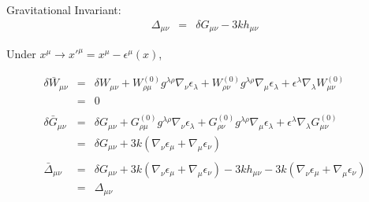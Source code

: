 \documentclass[10pt,letterpaper]{article}
\numberwithin{equation}{section}
\begin{document}
Gravitational Invariant:
\begin{eqnarray}
\Delta_{\mu\nu} &=& \delta G_{\mu\nu} - 3kh_{\mu\nu}
\end{eqnarray}

Under $x^\mu \to x'^{\mu} = x^\mu -\epsilon^\mu(x)$,

\begin{eqnarray}
\delta \bar W_{\mu\nu} &=& \delta W_{\mu\nu} + W^{(0)}_{\rho\mu}g^{\lambda\rho} \nabla_\nu \epsilon_\lambda + W^{(0)}_{\rho\nu}g^{\lambda\rho} \nabla_\mu \epsilon_\lambda + \epsilon^\lambda\nabla_\lambda W^{(0)}_{\mu\nu} 
\nonumber\\
&=&0
\nonumber\\\nonumber\\
\delta \bar G_{\mu\nu} &=& \delta G_{\mu\nu} + G^{(0)}_{\rho\mu}g^{\lambda\rho} \nabla_\nu \epsilon_\lambda + G^{(0)}_{\rho\nu}g^{\lambda\rho} \nabla_\mu \epsilon_\lambda + \epsilon^\lambda\nabla_\lambda G^{(0)}_{\mu\nu} 
\nonumber\\
&=&\delta G_{\mu\nu} + 3k(\nabla_\nu\epsilon_\mu + \nabla_\mu\epsilon_\nu)
\nonumber\\\nonumber\\
\bar\Delta _{\mu\nu} &=& \delta G_{\mu\nu} + 3k(\nabla_\nu\epsilon_\mu+\nabla_\mu\epsilon_\nu) -3kh_{\mu\nu} - 3k(\nabla_\nu\epsilon_\mu+\nabla_\mu\epsilon_\nu) 
\nonumber\\
&=& \Delta_{\mu\nu} 
\end{eqnarray}
%
%
\end{document}

